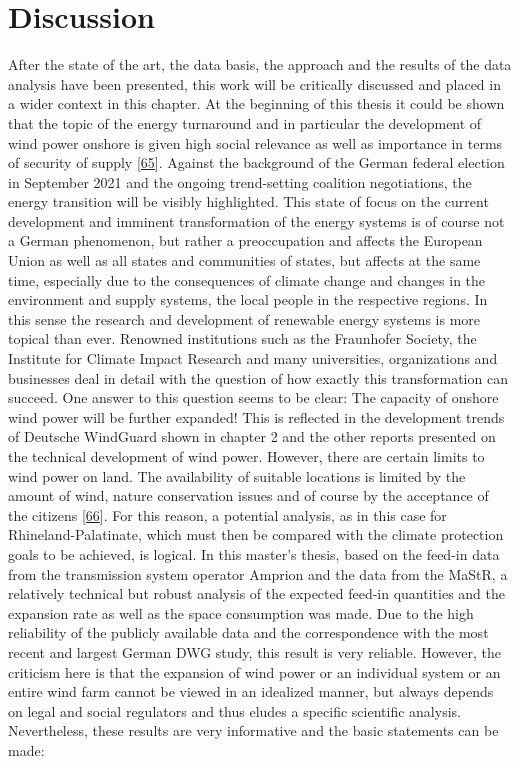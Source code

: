 \documentclass[a4paper,11pt]{article}
\begin{document}
\newpage

\hypertarget{discussion}{%
\section{Discussion}\label{discussion}}

After the state of the art, the data basis, the approach and the results of the data analysis have been presented, this work will be critically discussed and placed in a wider context in this chapter. At the beginning of this thesis it could be shown that the topic of the energy turnaround and in particular the development of wind power onshore is given high social relevance as well as importance in terms of security of supply {[}\protect\hyperlink{ref-ARD.2021}{65}{]}. Against the background of the German federal election in September 2021 and the ongoing trend-setting coalition negotiations, the energy transition will be visibly highlighted. This state of focus on the current development and imminent transformation of the energy systems is of course not a German phenomenon, but rather a preoccupation and affects the European Union as well as all states and communities of states, but affects at the same time, especially due to the consequences of climate change and changes in the environment and supply systems, the local people in the respective regions. In this sense the research and development of renewable energy systems is more topical than ever. Renowned institutions such as the Fraunhofer Society, the Institute for Climate Impact Research and many universities, organizations and businesses deal in detail with the question of how exactly this transformation can succeed. One answer to this question seems to be clear: The capacity of onshore wind power will be further expanded! This is reflected in the development trends of Deutsche WindGuard shown in chapter 2 and the other reports presented on the technical development of wind power. However, there are certain limits to wind power on land. The availability of suitable locations is limited by the amount of wind, nature conservation issues and of course by the acceptance of the citizens {[}\protect\hyperlink{ref-Stede.2019}{66}{]}. For this reason, a potential analysis, as in this case for Rhineland-Palatinate, which must then be compared with the climate protection goals to be achieved, is logical. In this master's thesis, based on the feed-in data from the transmission system operator Amprion and the data from the MaStR, a relatively technical but robust analysis of the expected feed-in quantities and the expansion rate as well as the space consumption was made. Due to the high reliability of the publicly available data and the correspondence with the most recent and largest German DWG study, this result is very reliable. However, the criticism here is that the expansion of wind power or an individual system or an entire wind farm cannot be viewed in an idealized manner, but always depends on legal and social regulators and thus eludes a specific scientific analysis. Nevertheless, these results are very informative and the basic statements can be made:
\end{document}
